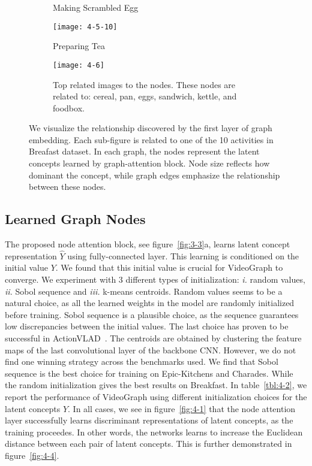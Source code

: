 \documentclass[10pt,twocolumn,letterpaper]{article}
\begin{document}
\begin{figure*}
\begin{subfigure}[t]{0.195\textwidth}
\caption{Making Scrambled Egg}
\vspace*{0mm}
\label{fig:4-5-9}
\end{subfigure}
\hfill
\begin{subfigure}[t]{0.195\textwidth}
\texttt{[image: 4-5-10]}
\caption{Preparing Tea}
\vspace*{0mm}
\label{fig:4-5-10}
\end{subfigure}
\vfill
\begin{subfigure}[t]{1.0\textwidth}
\texttt{[image: 4-6]}
\caption{Top related images to the nodes.
These nodes are related to: \textcolor{colornode05}{\newmoon} cereal, \textcolor{colornode08}{\newmoon} pan, \textcolor{colornode09}{\newmoon} eggs, \textcolor{colornode01}{\newmoon} sandwich, \textcolor{colornode04}{\newmoon} kettle, and \textcolor{colornode06}{\newmoon} foodbox.}
\vspace*{0mm}
\label{fig:4-5-11}
\end{subfigure}
\caption{We visualize the relationship discovered by the first layer of graph embedding.
Each sub-figure is related to one of the 10 activities in Breafast dataset.
In each graph, the nodes represent the latent concepts learned by graph-attention block. Node size reflects how dominant the concept, while graph edges emphasize the relationship between these nodes.}
\label{fig:4-5}
\end{figure*}

\subsection{Learned Graph Nodes}
The proposed node attention block, see figure~\ref{fig:3-3}{\color{red}a}, learns latent concept representation $\hat{Y}$ using fully-connected layer.
This learning is conditioned on the initial value $Y$.
We found that this initial value is crucial for VideoGraph to converge.
We experiment with 3 different types of initialization: \textit{i.} random values, \textit{ii.} Sobol sequence and \textit{iii.} k-means centroids.
Random values seems to be a natural choice, as all the learned weights in the model are randomly initialized before training.
Sobol sequence is a plausible choice, as the sequence guarantees low discrepancies between the initial values.
The last choice has proven to be successful in ActionVLAD~\cite{girdhar2017actionvlad}. The centroids are obtained by clustering the feature maps of the last convolutional layer of the backbone CNN.
However, we do not find one winning strategy across the benchmarks used.
We find that Sobol sequence is the best choice for training on Epic-Kitchens and Charades.
While the random initialization gives the best results on Breakfast.
In table~\ref{tbl:4-2}, we report the performance of VideoGraph using different initialization choices for the latent concepts $Y$.
In all cases, we see in figure~\ref{fig:4-1} that the node attention layer successfully learns discriminant representations of latent concepts, as the training proceedes.
In other words, the networks learns to increase the Euclidean distance between each pair of latent concepts.
This is further demonstrated in figure~\ref{fig:4-4}.
\end{document}
